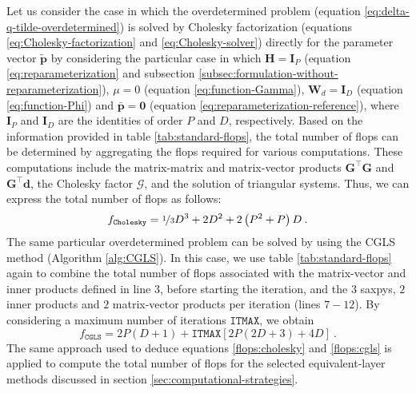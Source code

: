 Let us consider the case in which the overdetermined problem
(equation \ref{eq:delta-q-tilde-overdetermined}) is solved by Cholesky factorization (equations \ref{eq:Cholesky-factorization} and \ref{eq:Cholesky-solver})
directly for the parameter vector $\tilde{\mathbf{p}}$ by considering 
the particular case in which $\mathbf{H} = \mathbf{I}_{P}$ (equation \ref{eq:reparameterization} and 
subsection \ref{subsec:formulation-without-reparameterization}),
$\mu = 0$ (equation \ref{eq:function-Gamma}), 
$\mathbf{W}_{d} = \mathbf{I}_{D}$ (equation \ref{eq:function-Phi}) and
$\bar{\mathbf{p}} = \mathbf{0}$ (equation \ref{eq:reparameterization-reference}), 
where $\mathbf{I}_{P}$ and $\mathbf{I}_{D}$ are the identities of order $P$ and $D$, respectively.
Based on the information provided in table \ref{tab:standard-flops}, the total number of flops can be determined by aggregating the flops required for various computations. These computations include the matrix-matrix and matrix-vector products $\mathbf{G}^{\top}\mathbf{G}$ and $\mathbf{G}^{\top}\mathbf{d}$, 
the Cholesky factor $\boldsymbol{\mathcal{G}}$, and the solution of triangular systems. Thus, we can express the total number of flops as follows:
\begin{equation}
	f_{\mathtt{Cholesky}} = \nicefrac{1}{3}D^{3} + 2 D^{2} + 2 \left( P^{2} + P \right) D \: .
	\label{flops:cholesky}
\end{equation}
The same particular overdetermined problem can be solved by using the CGLS method (Algorithm \ref{alg:CGLS}).
In this case, we use table \ref{tab:standard-flops} again to combine the total number of
flops associated with the matrix-vector and inner products defined in line 3, before 
starting the iteration, and the $3$ saxpys, $2$ inner products and $2$ matrix-vector products
per iteration (lines $7-12$). By considering a maximum number of iterations $\mathtt{ITMAX}$, we obtain
\begin{equation}
	f_{\mathtt{CGLS}} = 2P(D+1) + \mathtt{ITMAX} \left[ 2P \left( 2D + 3 \right) + 4D \right] \: .
	\label{flops:cgls}
\end{equation}
The same approach used to deduce equations \ref{flops:cholesky} and \ref{flops:cgls} is
applied to compute the total number of flops for the selected equivalent-layer 
methods discussed in section \ref{sec:computational-strategies}.


